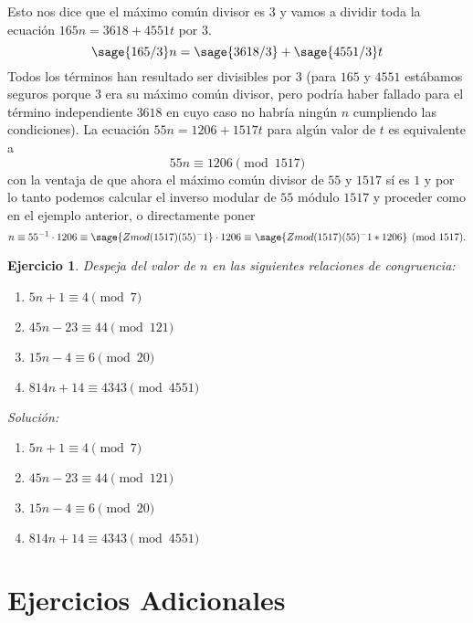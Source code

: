 \documentclass{amsart}
\newtheorem{ejer}{Ejercicio}
\begin{document}
Esto nos dice que el máximo común divisor es $3$ y vamos a dividir toda
la ecuación $165n = 3618+4551t$ por $3$.
$$ \sage{165/3} n = \sage{3618/3} + \sage{4551/3} t$$
Todos los términos han resultado ser divisibles por $3$ (para $165$ y 
$4551$ estábamos seguros porque $3$ era su máximo común divisor, pero
podría haber fallado para el término independiente $3618$ en cuyo caso
no habría ningún $n$ cumpliendo las condiciones). 
La ecuación $55n = 1206+1517t$ para algún valor de $t$ es equivalente
a
$$ 55n \equiv 1206 \pmod{1517}$$
con la ventaja de que ahora el máximo común divisor de $55$ y $1517$ sí
es $1$ y por lo tanto podemos calcular el inverso modular de $55$ módulo
$1517$ y proceder como en el ejemplo anterior, o directamente poner
$$ n \equiv 55^{-1} \cdot 1206 \equiv 
\sage{Zmod(1517)(55)^-1} \cdot 1206
\equiv \sage{Zmod(1517)(55)^-1 * 1206} \pmod{1517}.$$


\begin{ejer}
Despeja del valor de $n$ en las siguientes relaciones de congruencia:
\begin{enumerate}
\item $5n + 1 \equiv 4 \pmod{7}$
\item $45n - 23 \equiv 44 \pmod{121}$
\item $15n - 4 \equiv 6 \pmod{20}$
\item $814 n +14 \equiv 4343 \pmod{4551}$
\end{enumerate}
\end{ejer}
{\it Solución: }

\begin{enumerate}
\item $5n + 1 \equiv 4 \pmod{7}$

\item $45n - 23 \equiv 44 \pmod{121}$

\item $15n - 4 \equiv 6 \pmod{20}$

\item $814 n +14 \equiv 4343 \pmod{4551}$

\end{enumerate}

\section{Ejercicios Adicionales}
\end{document}
